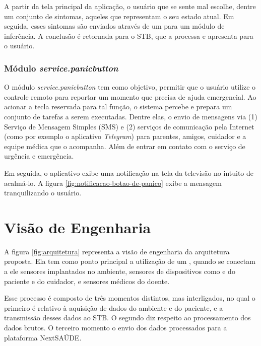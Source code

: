 A partir da tela principal da aplicação, o usuário que se sente mal escolhe, 
dentre um conjunto de sintomas, aqueles que representam o seu estado atual. Em
seguida, esses sintomas são enviados através de um \webservice[] para um
módulo de inferência. A conclusão é retornada para o STB, que a processa e 
apresenta para o usuário.


\subsubsection{Módulo \textit{service.panicbutton}}\label{subsubsec:panicbutton}

O módulo \textit{service.panicbutton} tem como objetivo, permitir que o usuário
utilize o controle remoto para reportar um momento que precisa de ajuda 
emergencial. Ao acionar a tecla reservada para tal função, o sistema percebe e
prepara um conjunto de tarefas a serem executadas. Dentre elas, o envio de 
mensagens via (1) Serviço de Mensagem Simples (SMS) e (2) serviços de comunicação
pela Internet (como por exemplo o aplicativo \textit{Telegram}) para parentes, 
amigos, cuidador e a equipe médica que o acompanha. Além de entrar em contato
com o serviço de urgência e emergência.

Em seguida, o aplicativo exibe uma notificação na tela da televisão no intuito
de acalmá-lo. A figura \ref{fig:notificacao-botao-de-panico} exibe a mensagem 
tranquilizando o usuário.


\section{Visão de Engenharia} \label{sec:visao-engenharia}

A figura \ref{fig:arquitetura} representa a visão de engenharia da arquitetura
proposta. Ela tem como ponto principal a utilização de um \stb[], quando se
conectam a ele sensores  implantados no ambiente, sensores de dispositivos como
\smartphones[] e  \smartwatches[] do paciente e do cuidador, e sensores médicos
do doente.


Esse processo é composto de três momentos distintos, mas  interligados, no qual
o primeiro é relativo à aquisição de dados do ambiente e do paciente, e a
transmissão desses dados ao STB. O segundo diz respeito ao processamento dos
dados brutos. O terceiro momento o envio dos dados processados para a plataforma
NextSAÚDE.

